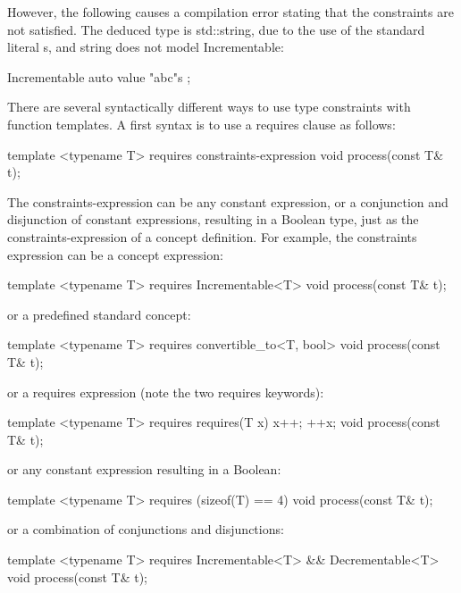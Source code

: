 However, the following causes a compilation error stating that the constraints are not satisfied. The deduced type is std::string, due to the use of the standard literal s, and string does not model Incrementable:

\begin{cpp}
Incrementable auto value { "abc"s };
\end{cpp}


There are several syntactically different ways to use type constraints with function templates. A first syntax is to use a requires clause as follows:

\begin{cpp}
template <typename T> requires constraints-expression
void process(const T& t);
\end{cpp}

The constraints-expression can be any constant expression, or a conjunction and disjunction of constant expressions, resulting in a Boolean type, just as the constraints-expression of a concept definition. For example, the constraints expression can be a concept expression:

\begin{cpp}
template <typename T> requires Incrementable<T>
void process(const T& t);
\end{cpp}

or a predefined standard concept:

\begin{cpp}
template <typename T> requires convertible_to<T, bool>
void process(const T& t);
\end{cpp}

or a requires expression (note the two requires keywords):

\begin{cpp}
template <typename T> requires requires(T x) { x++; ++x; }
void process(const T& t);
\end{cpp}

or any constant expression resulting in a Boolean:

\begin{cpp}
template <typename T> requires (sizeof(T) == 4)
void process(const T& t);
\end{cpp}

or a combination of conjunctions and disjunctions:

\begin{cpp}
template <typename T> requires Incrementable<T> && Decrementable<T>
void process(const T& t);
\end{cpp}

